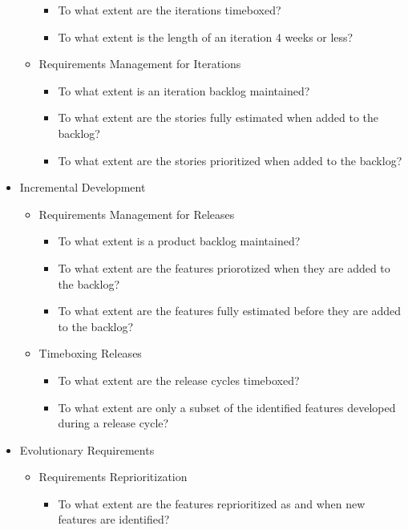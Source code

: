 \begin{itemize}
\begin{itemize}
\begin{itemize}
					\item To what extent are the iterations timeboxed?
					\item To what extent is the length of an iteration 4 weeks or less?
				\end{itemize}
			\item Requirements Management for Iterations
				\begin{itemize}
					\item To what extent is an iteration backlog maintained?
					\item To what extent are the stories fully estimated when added to the backlog?
					\item To what extent are the stories prioritized when added to the backlog?
				\end{itemize}
		\end{itemize}
	\item Incremental Development
		\begin{itemize}
			\item Requirements Management for Releases
				\begin{itemize}
					\item To what extent is a product backlog maintained?
					\item To what extent are the features priorotized when they are added to the backlog?
					\item To what extent are the features fully estimated before they are added to the backlog?
				\end{itemize}
			\item Timeboxing Releases
				\begin{itemize}
					\item To what extent are the release cycles timeboxed?
					\item To what extent are only a subset of the identified features developed during a release cycle?
				\end{itemize}
		\end{itemize}
	\item Evolutionary Requirements
		\begin{itemize}
			\item Requirements Reprioritization 
				\begin{itemize}
					\item To what extent are the features reprioritized as and when new features are identified?

\end{itemize}
\end{itemize}
\end{itemize}
